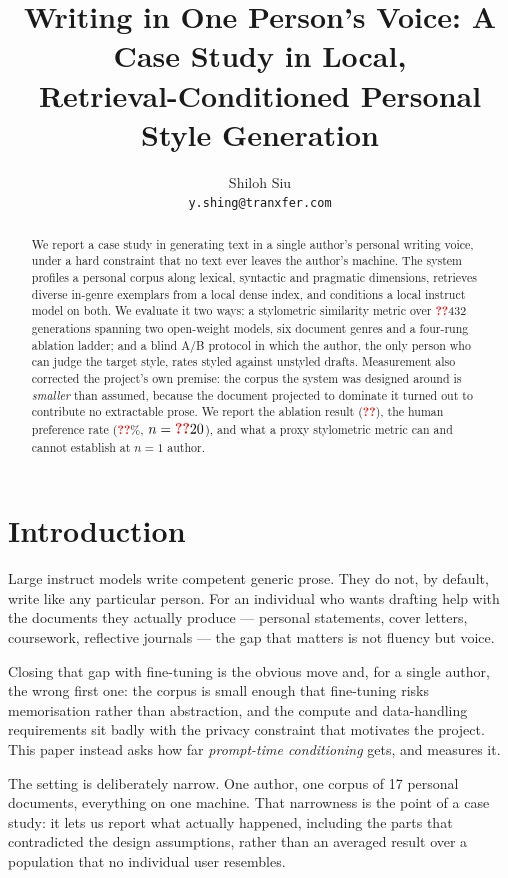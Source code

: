 \documentclass[11pt]{article}
\title{Writing in One Person's Voice: A Case Study in Local,\\
       Retrieval-Conditioned Personal Style Generation}
\author{Shiloh Siu \\
  \texttt{y.shing@tranxfer.com} \\}
\newcommand{\pending}[1][??]{\textcolor{red}{\textbf{#1}}}
\begin{document}
\maketitle

\begin{abstract}
We report a case study in generating text in a single author's personal writing
voice, under a hard constraint that no text ever leaves the author's machine.
The system profiles a personal corpus along lexical, syntactic and pragmatic
dimensions, retrieves diverse in-genre exemplars from a local dense index, and
conditions a local instruct model on both. We evaluate it two ways: a
stylometric similarity metric over \pending{432} generations spanning two
open-weight models, six document genres and a four-rung ablation ladder; and a
blind A/B protocol in which the author, the only person who can judge the
target style, rates styled against unstyled drafts. Measurement also corrected
the project's own premise: the corpus the system was designed around is
\emph{smaller} than assumed, because the document projected to dominate it
turned out to contribute no extractable prose. We report the ablation result
(\pending), the human preference rate (\pending\%, $n=\pending{20}$), and what a
proxy stylometric metric can and cannot establish at $n{=}1$ author.
\end{abstract}

\section{Introduction}
\label{sec:intro}

Large instruct models write competent generic prose. They do not, by default,
write like any particular person. For an individual who wants drafting help with
the documents they actually produce --- personal statements, cover letters,
coursework, reflective journals --- the gap that matters is not fluency but
voice.

Closing that gap with fine-tuning is the obvious move and, for a single author,
the wrong first one: the corpus is small enough that fine-tuning risks
memorisation rather than abstraction, and the compute and data-handling
requirements sit badly with the privacy constraint that motivates the project.
This paper instead asks how far \emph{prompt-time conditioning} gets, and
measures it.

The setting is deliberately narrow. One author, one corpus of 17 personal
documents, everything on one machine. That narrowness is the point of a case
study: it lets us report what actually happened, including the parts that
contradicted the design assumptions, rather than an averaged result over a
population that no individual user resembles.
\end{document}
